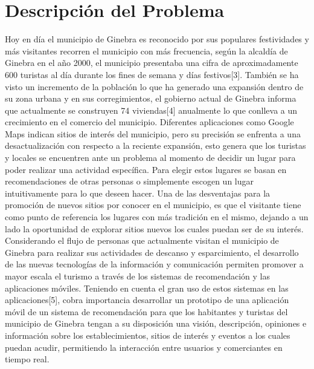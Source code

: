 \documentclass[12pt,letterpaper,openany]{book}
\begin{document}
\section{Descripción del Problema}
Hoy en día el municipio de Ginebra es reconocido por sus populares festividades y más visitantes recorren el municipio con más frecuencia, según la alcaldía de Ginebra en el año 2000, el municipio presentaba una cifra de aproximadamente 600 turistas al día durante los fines de semana y días festivos[3]. También se ha visto un incremento de la población lo que ha generado una expansión dentro de su zona urbana y en sus corregimientos, el gobierno actual de Ginebra informa que actualmente se construyen 74 viviendas[4] anualmente lo que conlleva a un crecimiento en el comercio del municipio. Diferentes aplicaciones como Google Maps indican sitios de interés del municipio, pero su precisión se enfrenta a una desactualización con respecto a la reciente expansión, esto genera que los turistas y locales se encuentren ante un problema al momento de decidir un lugar para poder realizar una actividad específica. Para elegir estos lugares se basan en recomendaciones de otras personas o simplemente escogen un lugar intuitivamente para lo que deseen hacer. 
\vspace{5mm}\newline
Una de las desventajas para la promoción de nuevos sitios por conocer en el municipio, es que el visitante tiene como punto de referencia los lugares con más tradición en el mismo, dejando a un lado la oportunidad de explorar sitios nuevos los cuales puedan ser de su interés.
\vspace{5mm}\newline
Considerando el flujo de personas que actualmente visitan el municipio de Ginebra para realizar sus actividades de descanso y esparcimiento, el desarrollo de las nuevas tecnologías de la información y comunicación permiten promover a mayor escala el turismo a través de los sistemas de recomendación y las aplicaciones móviles.
\vspace{5mm}\newline
Teniendo en cuenta el gran uso de estos sistemas en las aplicaciones[5], cobra importancia desarrollar un prototipo de una aplicación móvil de un sistema de recomendación para que los habitantes y turistas del municipio de Ginebra tengan a su disposición una visión, descripción, opiniones e información sobre los establecimientos, sitios de interés y eventos a los cuales puedan acudir, permitiendo la interacción entre usuarios y comerciantes en tiempo real.
\end{document}
